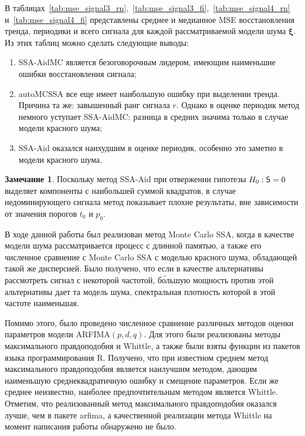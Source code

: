 \documentclass[specialist,
substylefile = spbu_report.rtx,
subf,12pt]{disser}
\theoremstyle{definition}
\newtheorem{remark}{Замечание}[chapter]
\begin{document}
В таблицах~\ref{tab:mse_signal3_rn},~\ref{tab:mse_signal3_fi},~\ref{tab:mse_signal4_rn} и~\ref{tab:mse_signal4_fi} представлены среднее и медианное MSE восстановления тренда, периодики и всего сигнала для каждой рассматриваемой модели шума $\bm\xi$. Из этих таблиц можно сделать следующие выводы:
\begin{enumerate}
	\item SSA-AidMC является безоговорочным лидером, имеющим наименьшие ошибки восстановления сигнала;
	\item autoMCSSA все еще имеет наибольшую ошибку при выделении тренда. Причина та же: завышенный ранг сигнала $r$. Однако в оценке периодик метод немного уступает SSA-AidMC: разница в средних значима только в случае модели красного шума;
	\item SSA-Aid оказался наихудшим в оценке периодик, особенно это заметно в модели красного шума.
\end{enumerate} 

\begin{remark}
	Поскольку метод SSA-Aid при отвержении гипотезы $H_0:\mathsf{S}=0$ выделяет компоненты с наибольшей суммой квадратов, в случае недоминирующего сигнала метод показывает плохие результаты, вне зависимости от значения порогов $t_0$ и $p_0$.
\end{remark}

\conclusion

В ходе данной работы был реализован метод Monte Carlo SSA, когда в качестве модели шума рассматривается процесс с длинной памятью, а также его численное сравнение с Monte Carlo SSA с моделью красного шума, обладающей такой же дисперсией. Было получено, что если в качестве альтернативы рассмотреть сигнал с некоторой частотой, б\'{о}льшую мощность против этой альтернативы дает та модель шума, спектральная плотность которой в этой частоте наименьшая.

Помимо этого, было проведено численное сравнение различных методов оценки параметров модели ARFIMA$(p, d, q)$. Для этого были реализованы методы максимального правдоподобия и Whittle, а также были взяты функции из пакетов языка программирования \textsf{R}. Получено, что при известном среднем метод максимального правдоподобия является наилучшим методом, дающим наименьшую среднеквадратичную ошибку и смещение параметров. Если же среднее неизвестно, наиболее предпочтительным методом является Whittle. Отметим, что реализованный метод максимального правдоподобия оказался лучше, чем в пакете \textsf{arfima}, а качественной реализации метода Whittle на момент написания работы обнаружено не было.
\end{document}
